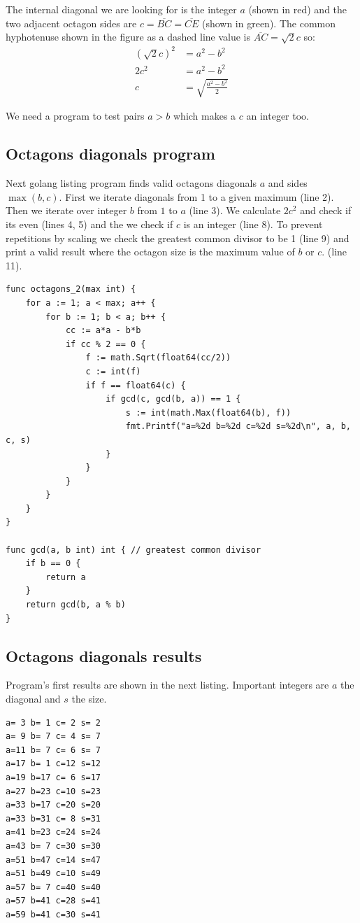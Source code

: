 \documentclass[11pt]{article}
\begin{document}
The internal diagonal we are looking for is the integer $a$ (shown in red) and the two
adjacent octagon sides are $c = \overline{BC} = \overline{CE}$ (shown in green).
The common hyphotenuse shown in the figure as a dashed line value is $\overline{AC} = \sqrt{2}c$ so:
\begin{align*}
(\sqrt{2}c)^2 &= a^2 - b^2\\
         2c^2 &= a^2 - b^2\\
            c &= \sqrt{\frac{a^2 - b^2}{2}}
\end{align*}

We need a program to test pairs $a > b$ which makes a $c$ an integer too.

\subsection{Octagons diagonals program}

Next golang listing program finds valid octagons diagonals $a$ and sides $\max(b,c)$.
First we iterate diagonals from 1 to a given maximum (line 2).
Then we iterate over integer $b$ from $1$ to $a$ (line 3).
We calculate $2c^2$ and check if its even (lines 4, 5) and the we check
if $c$ is an integer (line 8). To prevent repetitions by scaling we check
the greatest common divisor to be 1 (line 9) and print a valid result 
where the octagon size is the maximum value of $b$ or $c$. (line 11).
\begin{lstlisting}
func octagons_2(max int) {
	for a := 1; a < max; a++ {
		for b := 1; b < a; b++ {
			cc := a*a - b*b
			if cc % 2 == 0 {
				f := math.Sqrt(float64(cc/2))
				c := int(f)
				if f == float64(c) {
					if gcd(c, gcd(b, a)) == 1 {
						s := int(math.Max(float64(b), f))
						fmt.Printf("a=%2d b=%2d c=%2d s=%2d\n", a, b, c, s)
					}
				}
			}
		}
	}
}

func gcd(a, b int) int { // greatest common divisor
	if b == 0 {
		return a
	}
	return gcd(b, a % b)
}
\end{lstlisting}

\subsection{Octagons diagonals results}

Program's first results are shown in the next listing.
Important integers are $a$ the diagonal and $s$ the size.
\begin{lstlisting}
a= 3 b= 1 c= 2 s= 2
a= 9 b= 7 c= 4 s= 7
a=11 b= 7 c= 6 s= 7
a=17 b= 1 c=12 s=12
a=19 b=17 c= 6 s=17
a=27 b=23 c=10 s=23
a=33 b=17 c=20 s=20
a=33 b=31 c= 8 s=31
a=41 b=23 c=24 s=24
a=43 b= 7 c=30 s=30
a=51 b=47 c=14 s=47
a=51 b=49 c=10 s=49
a=57 b= 7 c=40 s=40
a=57 b=41 c=28 s=41
a=59 b=41 c=30 s=41
\end{lstlisting}
\end{document}
